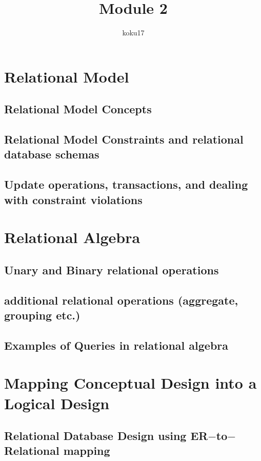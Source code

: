 \documentclass{article}
\title{Module 2}
\author{koku17}
\begin{document}
	\maketitle \thispagestyle{empty} \newpage
	\tableofcontents \thispagestyle{empty} \newpage
	\section{Relational Model}
	\subsection{Relational Model Concepts}
	\subsection{Relational Model Constraints and relational database schemas}
	\subsection{Update operations, transactions, and dealing with constraint violations}

	\section{Relational Algebra}
	\subsection{Unary and Binary relational operations}
	\subsection{additional relational operations (aggregate, grouping etc.)}
	\subsection{Examples of Queries in relational algebra}

	\section{Mapping Conceptual Design into a Logical Design}
	\subsection{Relational Database Design using ER$-$to$-$Relational mapping}
\end{document}
